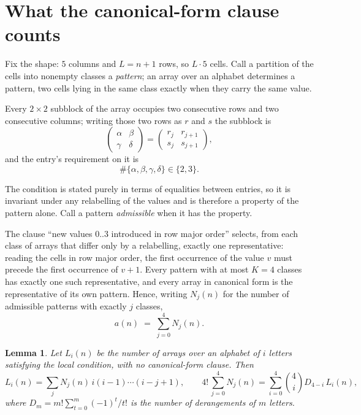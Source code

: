 \documentclass[11pt,a4paper]{article}
\theoremstyle{plain}
\newtheorem{lemma}[theorem]{Lemma}
\theoremstyle{definition}
\begin{document}
\section{What the canonical-form clause counts}

Fix the shape: $5$ columns and $L=n+1$ rows, so $L\cdot5$ cells. Call a
partition of the cells into nonempty classes a \emph{pattern}; an array over an alphabet
determines a pattern, two cells lying in the same class exactly when they carry the same
value.

Every $2\times2$ subblock of the array occupies two consecutive
rows and two consecutive columns; writing those two rows as $r$ and $s$ the
subblock is
\[
\begin{pmatrix}\alpha&\beta\\\gamma&\delta\end{pmatrix}=\begin{pmatrix}r_j&r_{j+1}\\s_j&s_{j+1}\end{pmatrix},
\]
and the entry's requirement on it is
\begin{equation}\label{eq:loc}
\#\{\alpha,\beta,\gamma,\delta\}\in\{2,3\}.
\end{equation}

The condition is stated purely in terms of equalities between entries, so it is invariant
under any relabelling of the values and is therefore a property of the pattern alone. Call a
pattern \emph{admissible} when it has the property.

The clause ``new values $0..3$ introduced in row major order'' selects, from each class
of arrays that differ only by a relabelling, exactly one representative: reading the cells in
row major order, the first occurrence of the value $v$ must precede the first occurrence of
$v+1$. Every pattern with at most $K=4$ classes has exactly one such representative, and
every array in canonical form is the representative of its own pattern. Hence, writing
$N_j(n)$ for the number of admissible patterns with exactly $j$ classes,
\begin{equation}\label{eq:apat}
a(n)\;=\;\sum_{j=0}^{4}N_j(n).
\end{equation}

\begin{lemma}\label{lem:inv}
Let $L_i(n)$ be the number of arrays over an alphabet of $i$ letters satisfying the local
condition, with no canonical-form clause. Then
\[
L_i(n)=\sum_j N_j(n)\,i(i-1)\cdots(i-j+1),
\qquad
4!\,\sum_{j=0}^{4}N_j(n)=\sum_{i=0}^{4}\binom{4}{i}D_{4-i}\,L_i(n),
\]
where $D_m=m!\sum_{t=0}^{m}(-1)^t/t!$ is the number of derangements of $m$ letters.
\end{lemma}
\end{document}
